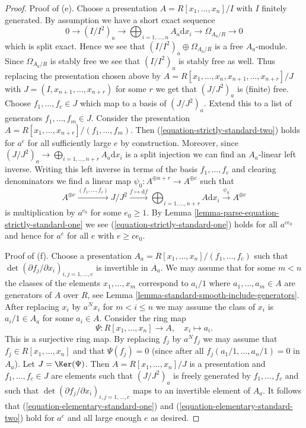 \begin{proof}
\medskip\noindent
Proof of (e). Choose a presentation
$A = R[x_1, \ldots, x_n]/I$ with $I$ finitely generated.
By assumption we have a short exact sequence
$$
0 \to (I/I^2)_a \to \bigoplus\nolimits_{i = 1, \ldots, n} A_a\text{d}x_i \to
\Omega_{A_a/R} \to 0
$$
which is split exact. Hence we see that
$(I/I^2)_a \oplus \Omega_{A_a/R}$ is a free $A_a$-module.
Since $\Omega_{A_a/R}$ is stably free we see that $(I/I^2)_a$
is stably free as well. Thus replacing the presentation chosen
above by $A = R[x_1, \ldots, x_n, x_{n + 1}, \ldots, x_{n + r}]/J$ with
$J = (I, x_{n + 1}, \ldots, x_{n + r})$ for some $r$ we get that $(J/J^2)_a$
is (finite) free. Choose $f_1, \ldots, f_c \in J$ which map to a basis of
$(J/J^2)_a$. Extend this to a list of generators
$f_1, \ldots, f_m \in J$. Consider the presentation
$A = R[x_1, \ldots, x_{n + r}]/(f_1, \ldots, f_m)$.
Then (\ref{equation-strictly-standard-two}) holds for $a^e$
for all sufficiently large $e$ by construction. Moreover, since
$(J/J^2)_a \to \bigoplus\nolimits_{i = 1, \ldots, n + r} A_a\text{d}x_i$
is a split injection we can find an $A_a$-linear left inverse.
Writing this left inverse in terms of the basis $f_1, \ldots, f_c$
and clearing denominators we find a linear map
$\psi_0 : A^{\oplus n + r} \to A^{\oplus c}$ such that
$$
A^{\oplus c} \xrightarrow{(f_1, \ldots, f_c)}
J/J^2 \xrightarrow{f \mapsto \text{d}f}
\bigoplus\nolimits_{i = 1, \ldots, n + r} A \text{d}x_i
\xrightarrow{\psi_0}
A^{\oplus c}
$$
is multiplication by $a^{e_0}$ for some $e_0 \geq 1$. By
Lemma \ref{lemma-parse-equation-strictly-standard-one}
we see (\ref{equation-strictly-standard-one})
holds for all $a^{ce_0}$ and hence for $a^e$ for all $e$ with $e \geq ce_0$.

\medskip\noindent
Proof of (f). Choose a presentation
$A_a = R[x_1, \ldots, x_n]/(f_1, \ldots, f_c)$ such that
$\det(\partial f_j/\partial x_i)_{i, j = 1, \ldots, c}$
is invertible in $A_a$. We may assume that for some
$m < n$ the classes of the elements $x_1, \ldots, x_m$
correspond to $a_i/1$ where $a_1, \ldots, a_m \in A$ are generators of $A$
over $R$, see Lemma \ref{lemma-standard-smooth-include-generators}.
After replacing $x_i$ by $a^Nx_i$ for $m < i \leq n$
we may assume the class of $x_i$ is $a_i/1 \in A_a$ for some
$a_i \in A$. Consider the ring map
$$
\Psi : R[x_1, \ldots, x_n] \longrightarrow A,\quad
x_i \longmapsto a_i.
$$
This is a surjective ring map. By replacing $f_j$ by $a^Nf_j$ we may
assume that $f_j \in R[x_1, \ldots, x_n]$ and that
$\Psi(f_j) = 0$ (since after all $f_j(a_1/1, \ldots, a_n/1) = 0$
in $A_a$). Let $J = \Ker(\Psi)$. Then $A = R[x_1, \ldots, x_n]/J$
is a presentation and $f_1, \ldots, f_c \in J$ are elements such that
$(J/J^2)_a$ is freely generated by $f_1, \ldots, f_c$ and such
that $\det(\partial f_j/\partial x_i)_{i, j = 1, \ldots, c}$
maps to an invertible element of $A_a$. It follows that
(\ref{equation-elementary-standard-one}) and
(\ref{equation-elementary-standard-two})
hold for $a^e$ and all large enough $e$ as desired.
\end{proof}






